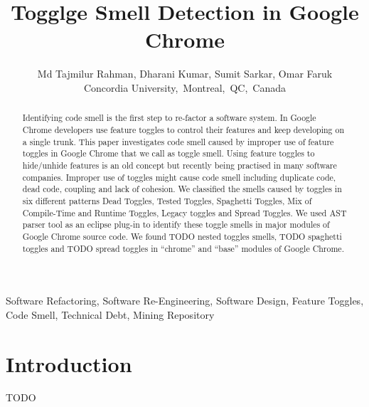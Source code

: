 \documentclass[conference]{IEEEtran}
\begin{document}
\title{Togglge Smell Detection in Google Chrome}
\author{
Md Tajmilur Rahman, Dharani Kumar, Sumit Sarkar, Omar Faruk\\
Concordia University,~Montreal,~QC,~Canada
}
\maketitle

\begin{abstract}
Identifying code smell is the first step to re-factor a software system. 
In Google Chrome developers use feature toggles to control their features 
and keep developing on a single trunk. This paper investigates code smell 
caused by improper use of feature toggles in Google Chrome that we call 
as toggle smell. Using feature toggles to hide/unhide features is an old 
concept but recently being practised in many software companies. Improper 
use of toggles might cause code smell including duplicate code, dead code, 
coupling and lack of cohesion. We classified the smells caused by toggles 
in six different patterns Dead Toggles, Tested Toggles, Spaghetti Toggles, 
Mix of Compile-Time and Runtime Toggles, Legacy toggles and Spread Toggles. 
We used AST parser tool as an eclipse plug-in to identify these toggle 
smells in major modules of Google Chrome source code. We found TODO 
nested toggles smells, TODO spaghetti toggles and TODO spread toggles in ``chrome'' and ``base'' modules of Google Chrome.\\
\end{abstract}

\begin{IEEEkeywords}
Software Refactoring, Software Re-Engineering, Software Design, Feature Toggles, Code Smell, Technical Debt, Mining Repository
\end{IEEEkeywords}

\section{Introduction}
TODO
\end{document}
